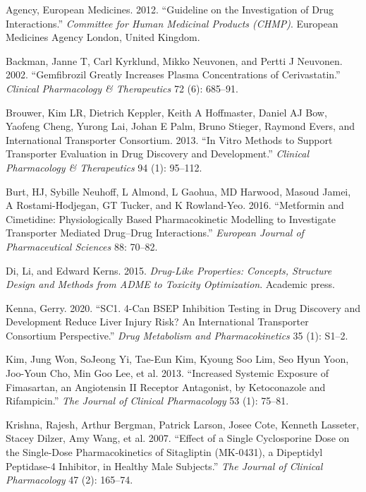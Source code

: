 \documentclass[
  11pt,
  krantz2, a4paper, twoside]{krantz}
\newlength{\cslentryspacing}
\begin{document}
\label{refs}
\setlength{\cslentryspacing}{0em}
\begin{CSLReferences}
Agency, European Medicines. 2012. {``Guideline on the Investigation of Drug Interactions.''} \emph{Committee for Human Medicinal Products (CHMP)}. European Medicines Agency London, United Kingdom.

Backman, Janne T, Carl Kyrklund, Mikko Neuvonen, and Pertti J Neuvonen. 2002. {``Gemfibrozil Greatly Increases Plasma Concentrations of Cerivastatin.''} \emph{Clinical Pharmacology \& Therapeutics} 72 (6): 685--91.

Brouwer, Kim LR, Dietrich Keppler, Keith A Hoffmaster, Daniel AJ Bow, Yaofeng Cheng, Yurong Lai, Johan E Palm, Bruno Stieger, Raymond Evers, and International Transporter Consortium. 2013. {``In Vitro Methods to Support Transporter Evaluation in Drug Discovery and Development.''} \emph{Clinical Pharmacology \& Therapeutics} 94 (1): 95--112.

Burt, HJ, Sybille Neuhoff, L Almond, L Gaohua, MD Harwood, Masoud Jamei, A Rostami-Hodjegan, GT Tucker, and K Rowland-Yeo. 2016. {``Metformin and Cimetidine: Physiologically Based Pharmacokinetic Modelling to Investigate Transporter Mediated Drug--Drug Interactions.''} \emph{European Journal of Pharmaceutical Sciences} 88: 70--82.

Di, Li, and Edward Kerns. 2015. \emph{Drug-Like Properties: Concepts, Structure Design and Methods from ADME to Toxicity Optimization}. Academic press.

Kenna, Gerry. 2020. {``SC1. 4-Can BSEP Inhibition Testing in Drug Discovery and Development Reduce Liver Injury Risk? An International Transporter Consortium Perspective.''} \emph{Drug Metabolism and Pharmacokinetics} 35 (1): S1--2.

Kim, Jung Won, SoJeong Yi, Tae-Eun Kim, Kyoung Soo Lim, Seo Hyun Yoon, Joo-Youn Cho, Min Goo Lee, et al. 2013. {``Increased Systemic Exposure of Fimasartan, an Angiotensin II Receptor Antagonist, by Ketoconazole and Rifampicin.''} \emph{The Journal of Clinical Pharmacology} 53 (1): 75--81.

Krishna, Rajesh, Arthur Bergman, Patrick Larson, Josee Cote, Kenneth Lasseter, Stacey Dilzer, Amy Wang, et al. 2007. {``Effect of a Single Cyclosporine Dose on the Single-Dose Pharmacokinetics of Sitagliptin (MK-0431), a Dipeptidyl Peptidase-4 Inhibitor, in Healthy Male Subjects.''} \emph{The Journal of Clinical Pharmacology} 47 (2): 165--74.


\end{CSLReferences}
\end{document}
